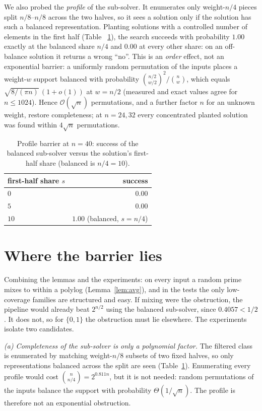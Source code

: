 \documentclass[conference]{IEEEtran}
\newcommand{\Oh}{\mathcal{O}}
\begin{document}
We also probed the \emph{profile} of the sub-solver. It enumerates only
weight-$n/4$ pieces split $n/8$--$n/8$ across the two halves, so it sees a
solution only if the solution has such a balanced representation. Planting
solutions with a controlled number of elements in the first half (Table
~\ref{tab:profile}), the search succeeds with probability $1.00$ exactly at the
balanced share $n/4$ and $0.00$ at every other share: on an off-balance
solution it returns a wrong ``no''. This is an \emph{order} effect, not an exponential barrier: a uniformly
random permutation of the inputs places a weight-$w$ support balanced with
probability $\binom{n/2}{w/2}^2/\binom{n}{w}$, which equals
$\sqrt{8/(\pi n)}\,(1+o(1))$ at $w=n/2$ (measured and exact values agree for
$n\le1024$). Hence $\Oh(\sqrt n)$ permutations, and a further factor $n$ for an
unknown weight, restore completeness; at $n=24,32$ every concentrated planted
solution was found within $4\sqrt n$ permutations.

\begin{table}[t]
\centering
\caption{Profile barrier at $n=40$: success of the balanced sub-solver versus
the solution's first-half share (balanced is $n/4=10$).}
\label{tab:profile}
\begin{tabular}{lr}
\toprule
first-half share $s$ & success\\
\midrule
$0$  & $0.00$\\
$5$  & $0.00$\\
$10$ & $1.00$ \quad (balanced, $s=n/4$)\\
\bottomrule
\end{tabular}
\end{table}

\section{Where the barrier lies}\label{sec:barrier}
Combining the lemmas and the experiments: on every input a random prime mixes to
within a polylog (Lemma~\ref{lem:avg}), and in the tests the only low-coverage
families are structured and easy. If mixing were the obstruction, the pipeline
would already beat $2^{n/2}$ using the balanced sub-solver, since
$0.4057<1/2$. It does not, so for $\{0,1\}$ the obstruction must lie elsewhere.
The experiments isolate two candidates.

\emph{(a) Completeness of the sub-solver is only a polynomial factor.} The
filtered class is enumerated by matching weight-$n/8$ subsets of two fixed
halves, so only representations balanced across the split are seen
(Table~\ref{tab:profile}). Enumerating every profile would cost
$\binom{n}{n/4}=2^{0.811n}$, but it is not needed: random permutations of the
inputs balance the support with probability $\Theta(1/\sqrt n)$. The profile is
therefore not an exponential obstruction.
\end{document}
